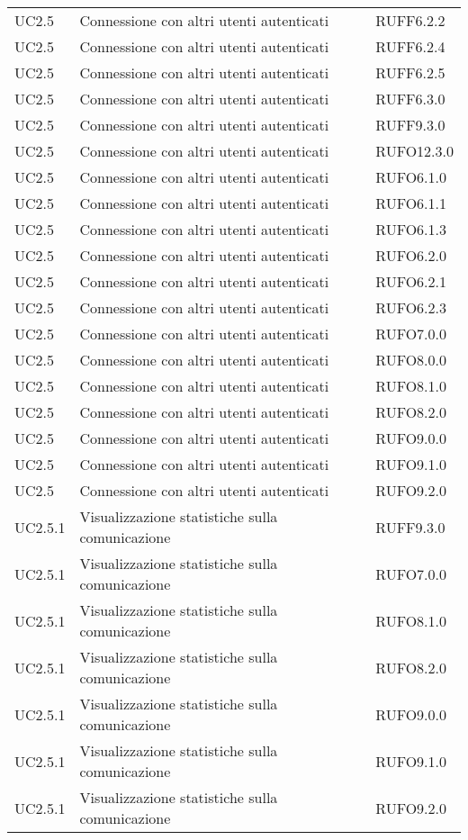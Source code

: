 \begin{longtable}{lp{}l}
UC2.5 & Connessione con altri utenti autenticati & RUFF6.2.2 \\
UC2.5 & Connessione con altri utenti autenticati & RUFF6.2.4 \\
UC2.5 & Connessione con altri utenti autenticati & RUFF6.2.5 \\
UC2.5 & Connessione con altri utenti autenticati & RUFF6.3.0 \\
UC2.5 & Connessione con altri utenti autenticati & RUFF9.3.0 \\
UC2.5 & Connessione con altri utenti autenticati & RUFO12.3.0 \\
UC2.5 & Connessione con altri utenti autenticati & RUFO6.1.0 \\
UC2.5 & Connessione con altri utenti autenticati & RUFO6.1.1 \\
UC2.5 & Connessione con altri utenti autenticati & RUFO6.1.3 \\
UC2.5 & Connessione con altri utenti autenticati & RUFO6.2.0 \\
UC2.5 & Connessione con altri utenti autenticati & RUFO6.2.1 \\
UC2.5 & Connessione con altri utenti autenticati & RUFO6.2.3 \\
UC2.5 & Connessione con altri utenti autenticati & RUFO7.0.0 \\
UC2.5 & Connessione con altri utenti autenticati & RUFO8.0.0 \\
UC2.5 & Connessione con altri utenti autenticati & RUFO8.1.0 \\
UC2.5 & Connessione con altri utenti autenticati & RUFO8.2.0 \\
UC2.5 & Connessione con altri utenti autenticati & RUFO9.0.0 \\
UC2.5 & Connessione con altri utenti autenticati & RUFO9.1.0 \\
UC2.5 & Connessione con altri utenti autenticati & RUFO9.2.0 \\
UC2.5.1 & Visualizzazione statistiche sulla comunicazione & RUFF9.3.0 \\
UC2.5.1 & Visualizzazione statistiche sulla comunicazione & RUFO7.0.0 \\
UC2.5.1 & Visualizzazione statistiche sulla comunicazione & RUFO8.1.0 \\
UC2.5.1 & Visualizzazione statistiche sulla comunicazione & RUFO8.2.0 \\
UC2.5.1 & Visualizzazione statistiche sulla comunicazione & RUFO9.0.0 \\
UC2.5.1 & Visualizzazione statistiche sulla comunicazione & RUFO9.1.0 \\
UC2.5.1 & Visualizzazione statistiche sulla comunicazione & RUFO9.2.0 \\
\bottomrule
\end{longtable}
